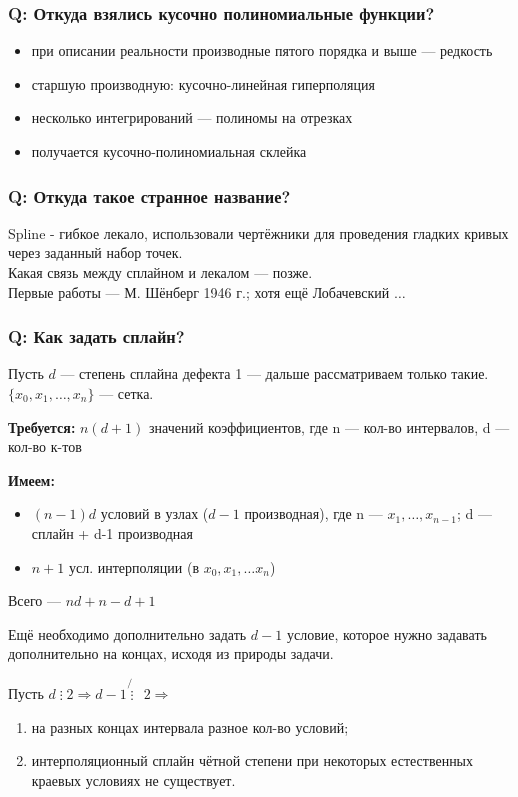 \subsubsection*{Q: Откуда взялись кусочно полиномиальные функции?}
\begin{itemize}
    \item при описании реальности производные пятого порядка и выше --- редкость
    \item старшую производную: кусочно-линейная гиперполяция
    \item несколько интегрирований --- полиномы на отрезках
    \item получается кусочно-полиномиальная склейка
\end{itemize}

\subsubsection*{Q: Откуда такое странное название?}
Spline - гибкое лекало, использовали чертёжники для проведения гладких кривых через заданный набор точек. \\
Какая связь между сплайном и лекалом --- позже. \\
Первые работы --- М. Шёнберг 1946 г.; хотя ещё Лобачевский $\dots$

\subsubsection*{Q: Как задать сплайн?}
Пусть $d$ --- степень сплайна дефекта 1 --- дальше рассматриваем только такие. \\ $\{x_0, x_1, \ldots, x_n\}$ --- сетка.

\textbf{Требуется:} $n(d+1)$ значений коэффициентов, где n --- кол-во интервалов, d --- кол-во к-тов

\textbf{Имеем:}
\begin{itemize}
    \item $(n-1)d$ условий в узлах ($d-1$ производная), где n --- $x_1, \ldots, x_{n-1}$; d --- сплайн + d-1 производная
    \item $n+1$ усл. интерполяции (в $x_0, x_1, \ldots x_n$)
\end{itemize}

Всего --- $nd+n-d+1$

Ещё необходимо дополнительно задать $d-1$ условие, которое нужно  задавать дополнительно на концах, исходя из природы задачи.

Пусть $d \mathrel{\vdots} 2 \Rightarrow d-1 \not{\mathrel{\vdots}} ~~ 2 \Rightarrow$
\begin{enumerate}
    \item на разных концах интервала разное кол-во условий;
    \item интерполяционный сплайн чётной степени при некоторых естественных краевых условиях не существует.
\end{enumerate}

